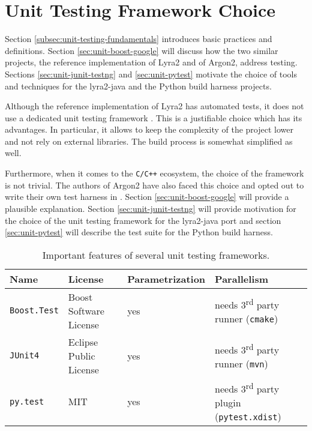 \chapter{Unit Testing Framework Choice}
\label{sec:unit-testing-framework-choice}

Section \ref{subsec:unit-testing-fundamentals} introduces basic practices and definitions. Section \ref{sec:unit-boost-google} will discuss how the two similar projects, the reference implementation of Lyra2 and of Argon2, address testing. Sections \ref{sec:unit-junit-testng} and \ref{sec:unit-pytest} motivate the choice of tools and techniques for the lyra2-java and the Python build harness projects.

Although the reference implementation of Lyra2 has automated tests, it does not use a dedicated unit testing framework \cite{github:2017:lyra}. This is a justifiable choice which has its advantages. In particular, it allows to keep the complexity of the project lower and not rely on external libraries. The build process is somewhat simplified as well.

Furthermore, when it comes to the \texttt{C/C++} ecosystem, the choice of the framework is not trivial. The authors of Argon2 have also faced this choice and opted out to write their own test harness in \cite{github:2017:argon2-test.c}. Section \ref{sec:unit-boost-google} will provide a plausible explanation. Section \ref{sec:unit-junit-testng} will provide motivation for the choice of the unit testing framework for the lyra2-java port and section \ref{sec:unit-pytest} will describe the test suite for the Python build harness.

\begin{table}
\begin{tabular}{llll}
    Name & License & Parametrization & Parallelism \\ \hline
\texttt{Boost.Test} & Boost Software License & yes & needs 3\textsuperscript{rd} party runner (\texttt{cmake}) \\
\texttt{JUnit4} & Eclipse Public License & yes & needs 3\textsuperscript{rd} party runner (\texttt{mvn}) \\
\texttt{py.test} & MIT & yes & needs 3\textsuperscript{rd} party plugin (\texttt{pytest.xdist})
\end{tabular}
\caption{Important features of several unit testing frameworks.}
\label{table:framework-features-cpp}
\end{table}


